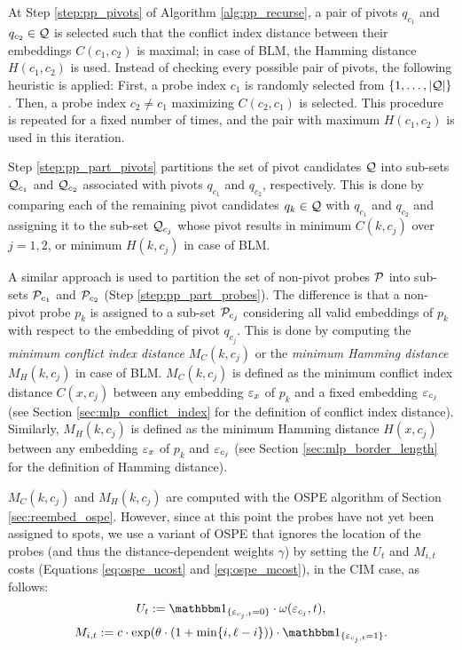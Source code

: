 At Step \ref{step:pp_pivots} of Algorithm \ref{alg:pp_recurse}, a pair of pivots
$q_{c_1}$ and $q_{c_2} \in {\mathcal{Q}}$ is selected such that the conflict index
distance between their embeddings $C(c_1,c_2)$ is maximal; in case of BLM, the
Hamming distance $H(c_1,c_2)$ is used. Instead of checking every possible pair
of pivots, the following heuristic is applied: First, a probe index $c_1$ is
randomly selected from $\{1,\dots,|{\mathcal{Q}}|\}$. Then, a probe index $c_2\neq c_1$
maximizing $C(c_2,c_1)$ is selected. This procedure is repeated for a fixed
number of times, and the pair with maximum $H(c_1,c_2)$ is used in this
iteration.

Step \ref{step:pp_part_pivots} partitions the set of pivot candidates ${\mathcal{Q}}$
into sub-sets ${\mathcal{Q}}_{c_1}$ and ${\mathcal{Q}}_{c_2}$ associated with pivots $q_{c_1}$
and $q_{c_2}$, respectively. This is done by comparing each of the remaining
pivot candidates $q_k \in {\mathcal{Q}}$ with $q_{c_1}$ and $q_{c_2}$ and assigning it
to the sub-set ${\mathcal{Q}}_{c_j}$ whose pivot results in minimum $C(k,c_j)$ over
$j=1,2$, or minimum $H(k,c_j)$ in case of BLM.

A similar approach is used to partition the set of non-pivot probes ${\mathcal{P}}$ into
sub-sets ${\mathcal{P}}_{c_1}$ and ${\mathcal{P}}_{c_2}$ (Step \ref{step:pp_part_probes}). The
difference is that a non-pivot probe $p_k$ is assigned to a sub-set
${\mathcal{P}}_{c_j}$ considering all valid embeddings of $p_k$ with respect to the
embedding of pivot $q_{c_j}$. This is done by computing the \emph{minimum
conflict index distance} $M_C(k,c_j)$ or the \emph{minimum Hamming distance}
$M_H(k,c_j)$ in case of BLM. $M_C(k,c_j)$ is defined as the minimum conflict
index distance $C(x,c_j)$ between any embedding $\varepsilon_{x}$ of $p_k$
and a fixed embedding $\varepsilon_{c_j}$ (see Section \ref{sec:mlp_conflict_index} for
the definition of conflict index distance). Similarly, $M_H(k,c_j)$ is defined
as the minimum Hamming distance $H(x,c_j)$ between any embedding
$\varepsilon_{x}$ of $p_k$ and $\varepsilon_{c_j}$ (see Section
\ref{sec:mlp_border_length} for the definition of Hamming distance).

$M_C(k,c_j)$ and $M_H(k,c_j)$ are computed with the OSPE algorithm of Section
\ref{sec:reembed_ospe}. However, since at this point the probes have not yet
been assigned to spots, we use a variant of OSPE that ignores the location of
the probes (and thus the distance-dependent weights $\gamma$) by setting the
$U_t$ and $M_{i,t}$ costs (Equations \ref{eq:ospe_ucost} and
\ref{eq:ospe_mcost}), in the CIM case, as follows:
\[
U_t := \Ind{\eps_{c_j,t}=0} \cdot \omega(\eps_{c_j},t),
\]
\[
M_{i,t} := c \cdot \exp(\theta\cdot (1+\min\{i,\ell-i\})) \cdot \Ind{\eps_{c_j,t}=1}.
\]

